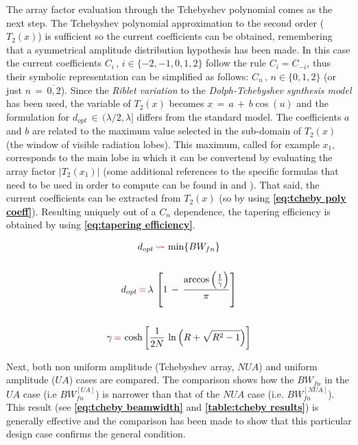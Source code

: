 \documentclass[10 pt,a4paper,twocolumn]{article}
\begin{document}
{The array factor evaluation through the Tchebyshev polynomial comes as the next step. The Tchebyshev polynomial approximation to the second order ($T_2(x)$) is sufficient so the current coefficients can be obtained, remembering that a symmetrical amplitude distribution hypothesis has been made. In this case the current coefficients $C_i\,,\,i\in\{-2,-1,0,1,2\}$ follow the rule $C_i=C_{-i}$, thus their symbolic representation can be simplified as follows: $C_n\,,\,n\in\{0,1,2\}$ (or just $n\,=\,\overline{0,2}$). Since the \emph{Riblet variation} to the \emph{Dolph-Tchebyshev synthesis model} has been used, the variable of $T_2(x)$ becomes $x\,=\,a\,+\,b\cos(u)$ and the formulation for $d_{opt}\,\in\,({\lambda}/{2},\lambda]$ differs from the standard model. The coefficients $a$ and $b$ are related to the maximum value selected in the sub-domain of $T_2(x)$ (the window of visible radiation lobes). This maximum, called for example $x_1$, corresponds to the main lobe in which it can be convertend by evaluating the array factor $|T_2(x_1)|$ (some additional references to the specific formulas that need to be used in order to compute can be found in \textbf{\cite{Balanis1}} and \textbf{\cite{ewa}}). That said, the current coefficients can be extracted from $T_2(x)$ (so by using \textbf{\cref{eq:tcheby poly coeff}}). Resulting uniquely out of a $C_n$ dependence, the tapering efficiency is obtained by using \textbf{\cref{eq:tapering efficiency}}.

{\begin{equation}
		\begin{gathered}
			d_{opt}\,{\color{Mahogany}\leadsto}\,\min\{BW_{fn}\}\\
			\\
			d_{opt}\,{\color{Mahogany}=}\,\lambda\,\left[1\,-\,\frac{\arccos\left(\frac{1}{\gamma}\right)}{\pi}\right]\\
			\\
			\gamma\,{\color{Mahogany}=}\,\cosh\left[\frac{1}{2N}\,\ln\left(R+\sqrt{R^2-1}\right)\right]
		\end{gathered}
		\label{eq:test}
	\end{equation}
}
\indent 

Next, both non uniform amplitude (Tchebyshev array, $NUA$) and uniform amplitude ($UA$)  cases are compared. The comparison shows how the $BW_{fn}$ in the $UA$ case (i.e $BW_{fn}^{[UA]}$) is narrower than that of the $NUA$ case (i.e. $BW_{fn}^{[NUA]}$). This result (see \textbf{\cref{eq:tcheby beamwidth}} and \textbf{\cref{table:tcheby results}}) is generally effective and the comparison has been made to show that this particular design case confirms the general condition. 



}
\end{document}
